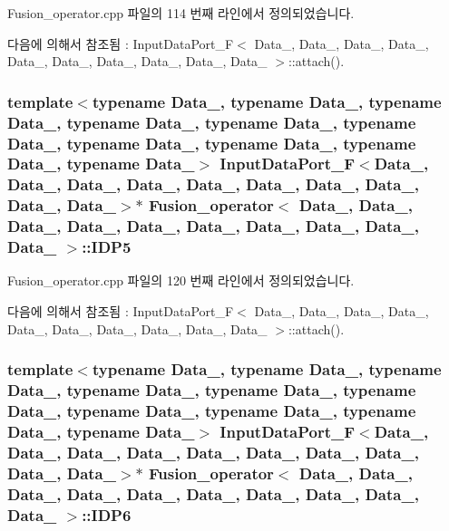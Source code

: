 Fusion\+\_\+operator.\+cpp 파일의 114 번째 라인에서 정의되었습니다.



다음에 의해서 참조됨 \+:  Input\+Data\+Port\+\_\+\+F$<$ Data\+\_, Data\+\_, Data\+\_, Data\+\_, Data\+\_, Data\+\_, Data\+\_, Data\+\_, Data\+\_, Data\+\_ $>$\+::attach().

\subsubsection[{\texorpdfstring{I\+D\+P5}{IDP5}}]{\setlength{\rightskip}{0pt plus 5cm}template$<$typename Data\+\_, typename Data\+\_, typename Data\+\_, typename Data\+\_, typename Data\+\_, typename Data\+\_, typename Data\+\_, typename Data\+\_, typename Data\+\_, typename Data\+\_$>$ {\bf Input\+Data\+Port\+\_\+F}$<$Data\+\_, Data\+\_, Data\+\_, Data\+\_, Data\+\_, Data\+\_, Data\+\_, Data\+\_, Data\+\_, Data\+\_$>$$\ast$ {\bf Fusion\+\_\+operator}$<$ Data\+\_, Data\+\_, Data\+\_, Data\+\_, Data\+\_, Data\+\_, Data\+\_, Data\+\_, Data\+\_, Data\+\_ $>$\+::I\+D\+P5}\hypertarget{classFusion__operator_ae1ea70ef80557cc22efefb7cb5bae955}{}\label{classFusion__operator_ae1ea70ef80557cc22efefb7cb5bae955}


Fusion\+\_\+operator.\+cpp 파일의 120 번째 라인에서 정의되었습니다.



다음에 의해서 참조됨 \+:  Input\+Data\+Port\+\_\+\+F$<$ Data\+\_, Data\+\_, Data\+\_, Data\+\_, Data\+\_, Data\+\_, Data\+\_, Data\+\_, Data\+\_, Data\+\_ $>$\+::attach().

\subsubsection[{\texorpdfstring{I\+D\+P6}{IDP6}}]{\setlength{\rightskip}{0pt plus 5cm}template$<$typename Data\+\_, typename Data\+\_, typename Data\+\_, typename Data\+\_, typename Data\+\_, typename Data\+\_, typename Data\+\_, typename Data\+\_, typename Data\+\_, typename Data\+\_$>$ {\bf Input\+Data\+Port\+\_\+F}$<$Data\+\_, Data\+\_, Data\+\_, Data\+\_, Data\+\_, Data\+\_, Data\+\_, Data\+\_, Data\+\_, Data\+\_$>$$\ast$ {\bf Fusion\+\_\+operator}$<$ Data\+\_, Data\+\_, Data\+\_, Data\+\_, Data\+\_, Data\+\_, Data\+\_, Data\+\_, Data\+\_, Data\+\_ $>$\+::I\+D\+P6}\hypertarget{classFusion__operator_a380165fcccb240f43de928c329b93ddf}{}\label{classFusion__operator_a380165fcccb240f43de928c329b93ddf}


